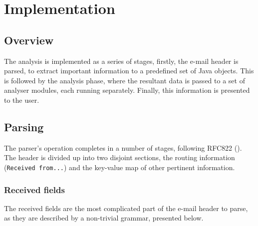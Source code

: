 \chapter{Implementation}
\section{Overview}
The  analysis is implemented as a series of stages, firstly, the e-mail header is parsed, to extract important information to a predefined set of Java objects.  This is followed by the analysis phase, where the resultant data is passed to a set of analyser modules, each running separately.  Finally, this information is presented to the user.

\section{Parsing}
The parser's operation completes in a number of stages, following RFC822 (\cite{RFC0822}).  The header is divided up into two disjoint sections, the routing information (\texttt{Received from...}) and the key-value map of other pertinent information.
\subsection{Received fields}
The received fields are the most complicated part of the e-mail header to parse, as they are described by a non-trivial grammar, presented below.

